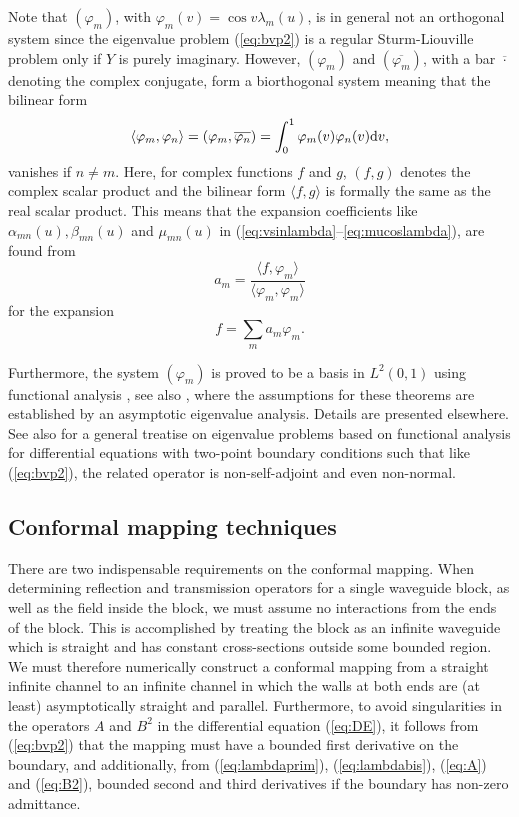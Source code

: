 \documentclass[numreferences]{kluwer}
\begin{document}
Note that $(\varphi_m)$, with $\varphi_m(v)=\cos v\lambda_m(u)$, is in
general not an orthogonal system since the eigenvalue problem
(\ref{eq:bvp2}) is a regular Sturm-Liouville problem only if $Y$ is
purely imaginary. However, $(\varphi_m)$ and $(\overline{\varphi_m})$,
with a bar $\overline{\cdot}$ denoting the complex conjugate, form a
biorthogonal system meaning that the bilinear form
\begin{equation}\label{eq:bilinear}
  \langle \varphi_m,\varphi_n\rangle 
  =(\varphi_m,\overline{\varphi_n})
  =\int_0^1\varphi_m(v)\varphi_n(v){\rm d}v,
\end{equation}
vanishes if $n\neq m$. Here, for complex functions $f$ and $g$,
$(f,g)$ denotes the complex scalar product and the bilinear form
$\langle f,g \rangle$ is formally the same as the real scalar
product. This means that the expansion coefficients like
$\alpha_{mn}(u),\beta_{mn}(u)$ and $\mu_{mn}(u)$ in
(\ref{eq:vsinlambda}--\ref{eq:mucoslambda}), are found from
\begin{equation}\label{eq:am}
 a_m=\frac{\langle f,\varphi_m \rangle}{\langle \varphi_m,\varphi_m \rangle}
\end{equation}
for the expansion
\begin{equation}\label{eq:expansion}
  f=\sum_m a_m \varphi_m.
\end{equation}

Furthermore, the system $(\varphi_m)$ is proved to be a basis in
$L^2(0,1)$ using functional analysis \cite{Benzinger:1974}, see also
\cite{Kato:1995}, where the assumptions for these theorems are
established by an asymptotic eigenvalue analysis. Details are
presented elsewhere. See also \cite{Locker:2000} for a general
treatise on eigenvalue problems based on functional analysis for
differential equations with two-point boundary conditions such that
like (\ref{eq:bvp2}), the related operator is non-self-adjoint and
even non-normal. 

\subsection{Conformal mapping techniques}
\label{sec:confmap}

There are two indispensable requirements on the conformal
mapping. When determining reflection and transmission operators for a
single waveguide block, as well as the field inside the block, we must
assume no interactions from the ends of the block. This is
accomplished by treating the block as an infinite waveguide which is
straight and has constant cross-sections outside some bounded
region. We must therefore numerically construct a conformal mapping
from a straight infinite channel to an infinite channel in which the
walls at both ends are (at least) asymptotically straight and
parallel. Furthermore, to avoid singularities in the operators $A$ and
$B^2$ in the differential equation (\ref{eq:DE}), it follows from
(\ref{eq:bvp2}) that the mapping must have a bounded first derivative
on the boundary, and additionally, from (\ref{eq:lambdaprim}),
(\ref{eq:lambdabis}), (\ref{eq:A}) and (\ref{eq:B2}), bounded second
and third derivatives if the boundary has non-zero admittance.
\end{document}
